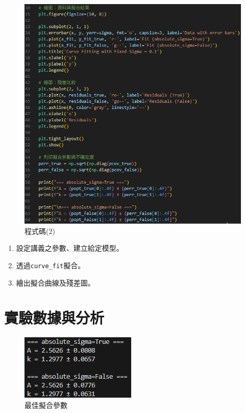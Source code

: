 \documentclass[12pt,a4paper]{article}
\begin{document}
\begin{CJK}{UTF8}{bkai}
\clearpage

\begin{figure}[h]
    \centering
    \includegraphics[width=1\linewidth]{2.png}
    \caption{程式碼(2)}
    \label{fig:py2}
\end{figure}

\begin{enumerate}
    \item 設定講義之參數、建立給定模型。
    \item 透過\texttt{curve\_fit}擬合。
    \item 繪出擬合曲線及殘差圖。
    
\end{enumerate}

\clearpage

\section{實驗數據與分析}
\hfill

\begin{figure}[h]
    \centering
    \includegraphics[width=0.5\linewidth]{output3.png}
    \caption{最佳擬合參數}
    \label{fig:op3}
\end{figure}


\end{CJK}
\end{document}
